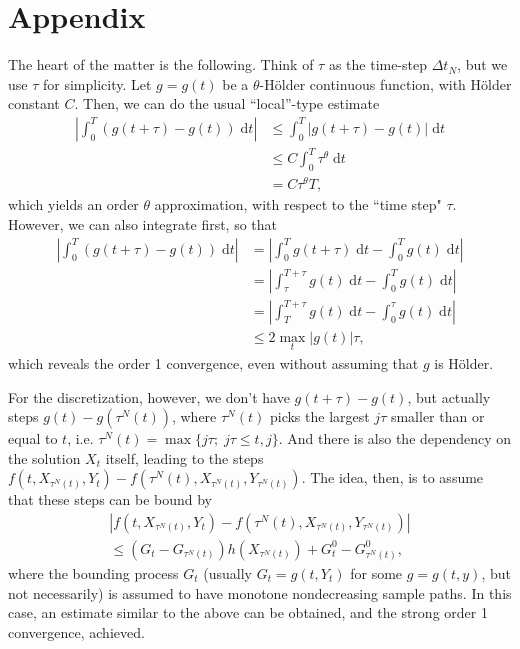 \documentclass[reqno,12pt]{amsart}
\theoremstyle{plain}%
\theoremstyle{definition}
\begin{document}
\section*{Appendix}

The heart of the matter is the following. Think of $\tau$ as the time-step $\Delta t_N$, but we use $\tau$ for simplicity. Let $g=g(t)$ be a $\theta$-H\"older continuous function, with H\"older constant $C$. Then, we can do the usual ``local''-type estimate
\begin{align*}
    \left|\int_0^T \left(g(t + \tau) - g(t) \right) \;\mathrm{d}t \right| & \leq \int_0^T \left|g(t + \tau) - g(t) \right| \;\mathrm{d}t \\
    & \leq C\int_0^T \tau^{\theta} \;\mathrm{d}t \\
    & = C\tau^{\theta}T,
\end{align*}
which yields an order $\theta$ approximation, with respect to the ``time step" $\tau$. However, we can also integrate first, so that
\begin{align*}
    \left|\int_0^T \left(g(t + \tau) - g(t) \right) \;\mathrm{d}t \right| & = \left|\int_0^T g(t + \tau) \;\mathrm{d}t - \int_0^T g(t) \;\mathrm{d}t \right| \\ 
    & = \left| \int_\tau^{T+\tau} g(t) \;\mathrm{d}t - \int_0^T g(t) \;\mathrm{d}t \right| \\
    & = \left| \int_T^{T+\tau} g(t) \;\mathrm{d}t - \int_0^\tau g(t) \;\mathrm{d}t \right| \\
    & \leq 2\max_t|g(t)| \tau,
\end{align*}
which reveals the order 1 convergence, even without assuming that $g$ is H\"older.

For the discretization, however, we don't have $g(t+\tau) - g(t)$, but actually steps $g(t) - g(\tau^N(t))$, where $\tau^N(t)$ picks the largest $j\tau$ smaller than or equal to $t$, i.e. $\tau^N(t) = \max\{j\tau; \; j\tau \leq t, j\}$. And there is also the dependency on the solution $X_t$ itself, leading to the steps $f(t, X_{\tau^N(t)}, Y_t) - f(\tau^N(t), X_{\tau^N(t)}, Y_{\tau^N(t)})$. The idea, then, is to assume that these steps can be bound by
\begin{multline*}
  |f(t, X_{\tau^N(t)}, Y_t) - f(\tau^N(t), X_{\tau^N(t)}, Y_{\tau^N(t)})| \\
  \leq (G_t - G_{\tau^N(t)})h(X_{\tau^N(t)}) + G^0_t - G^0_{\tau^N(t)},
\end{multline*}
where the bounding process $G_t$ (usually $G_t = g(t, Y_t)$ for some $g=g(t, y)$, but not necessarily) is assumed to have monotone nondecreasing sample paths. In this case, an estimate similar to the above can be obtained, and the strong order 1 convergence, achieved.
\end{document}
